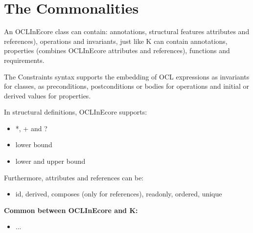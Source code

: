 
\section{The Commonalities}
\label{sec:common}

An OCLInEcore class can contain: annotations, structural features attributes and references), operations and invariants, 
just like K can contain annotations, properties (combines OCLInEcore attributes and references), functions and
requirements.

The Constraints syntax supports the embedding of OCL expressions as invariants for classes, as preconditions, postconditions or bodies for operations and initial or derived values for properties.

In structural definitions, OCLInEcore supports:

\begin{itemize}
  \item *, + and ?
  \item lower bound
  \item lower and upper bound
\end{itemize}

Furthermore, attributes and references can be:

\begin{itemize}
  \item id, derived, composes (only for references), 
    readonly, ordered, unique
\end{itemize}


{\bf Common between OCLInEcore and K:}

\begin{itemize}
  \item ...
\end{itemize}